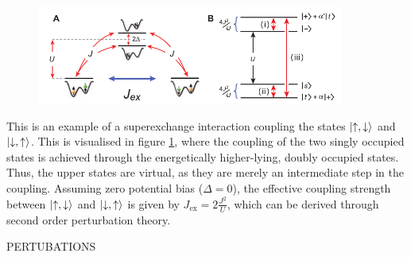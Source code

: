 \begin{figure}[h]
	\centering
	\includegraphics[width=0.9\textwidth]{Figures/SXEschematic.pdf}
	\caption{\textit{\cite{Trotzky2008} }}
	\label{fig:superexchange}
\end{figure}
This is an example of a superexchange interaction coupling the states $\ket{\uparrow,\downarrow}$ and $\ket{\downarrow,\uparrow}$. This is visualised in figure \ref{fig:superexchange}, where the coupling of the two singly occupied states is achieved through the energetically higher-lying, doubly occupied states. Thus, the upper states are virtual, as they are merely an intermediate step in the coupling.
Assuming zero potential bias ($\Delta = 0$), the effective coupling strength between $\ket{\uparrow,\downarrow}$ and $\ket{\downarrow,\uparrow}$ is given by $J_{\mathrm{ex}} = 2 \frac{J^2}{U}$, which can be derived through second order perturbation theory. 

PERTUBATIONS

